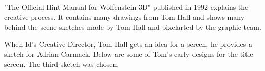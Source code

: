 \documentclass[book.tex]{subfiles}
\begin{document}
\begin{minipage}{0.7\textwidth}
"The Official Hint Manual for Wolfenstein 3D" published in 1992 explains the creative process. It contains many drawings from Tom Hall and shows many behind the scene sketches made by Tom Hall and pixelarted by the graphic team.\\
\par
 \begin{fancyquotes}
When Id's Creative Director, Tom Hall gets an idea for a screen, he provides a sketch for Adrian Carmack. Below are some of Tom's early designs for the title screen. The third sketch was chosen.\\
\end{fancyquotes}
\end{minipage}
\begin{minipage}{0.3\textwidth}
\begin{flushright}
\end{flushright}
\end{minipage}

\noindent
   \begin{figure}[H]
\centering
 \par
 \end{figure}
 \par
   

 





\label{hitler_drawing}
\begin{figure}[H]
\centering    
   \end{figure}



     \begin{figure}[H]
\centering
   \end{figure}
 
  \begin{figure}[H]
\centering
 \\
 \end{figure}



     \begin{figure}[H]
\centering
   \end{figure}
\end{document}
